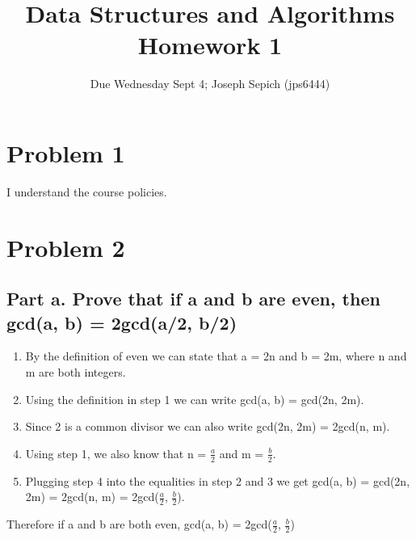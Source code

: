\documentclass[]{article}
\title{Data Structures and Algorithms Homework 1}
\subtitle{Due Wednesday Sept 4; Joseph Sepich (jps6444)}
\author{}
\date{}
\providecommand{\tightlist}{%
  \setlength{\itemsep}{0pt}\setlength{\parskip}{0pt}}
\begin{document}
\maketitle

\section{Problem 1}\label{problem-1}

I understand the course policies.

\pagebreak

\section{Problem 2}\label{problem-2}

\subsection{Part a. Prove that if a and b are even, then gcd(a, b) =
2gcd(a/2,
b/2)}\label{part-a.-prove-that-if-a-and-b-are-even-then-gcda-b-2gcda2-b2}

\begin{enumerate}
\def\labelenumi{\arabic{enumi}.}
\tightlist
\item
  By the definition of even we can state that a = 2n and b = 2m, where n
  and m are both integers.
\item
  Using the definition in step 1 we can write gcd(a, b) = gcd(2n, 2m).
\item
  Since 2 is a common divisor we can also write gcd(2n, 2m) = 2gcd(n,
  m).
\item
  Using step 1, we also know that n = \(\frac{a}{2}\) and m =
  \(\frac{b}{2}\).
\item
  Plugging step 4 into the equalities in step 2 and 3 we get gcd(a, b) =
  gcd(2n, 2m) = 2gcd(n, m) = 2gcd(\(\frac{a}{2}\), \(\frac{b}{2}\)).
\end{enumerate}

Therefore if a and b are both even, gcd(a, b) = 2gcd(\(\frac{a}{2}\),
\(\frac{b}{2}\))
\end{document}
